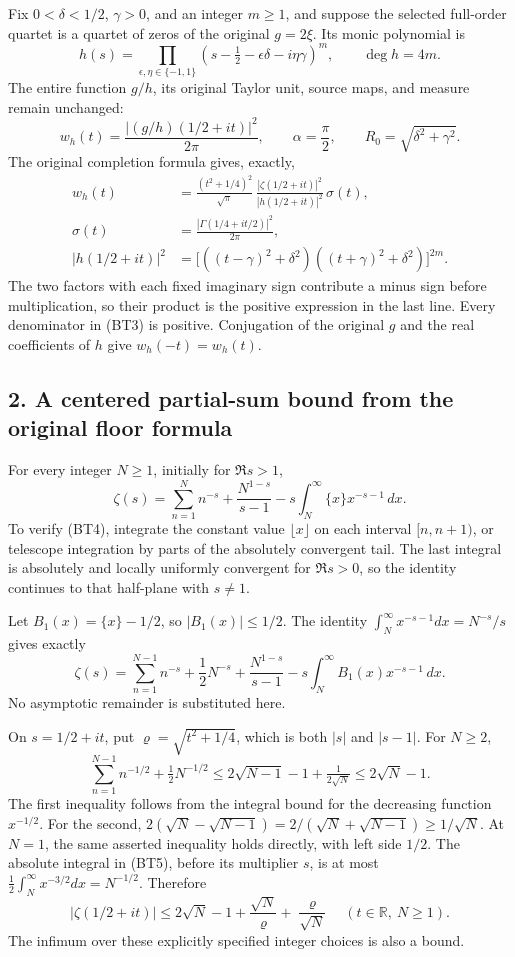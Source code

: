 \documentclass[11pt,a4paper]{article}
\begin{document}
Fix \(0<\delta<1/2\), \(\gamma>0\), and an integer \(m\ge1\), and suppose the selected full-order quartet is a quartet of zeros of the original \(g=2\xi\). Its monic polynomial is \[
h(s)=\prod_{\epsilon,\eta\in\{-1,1\}}
 (s-\tfrac12-\epsilon\delta-i\eta\gamma)^m,
\qquad \deg h=4m.
\tag{BT1}
\] The entire function \(g/h\), its original Taylor unit, source maps, and measure remain unchanged: \[
w_h(t)=\frac{|(g/h)(1/2+it)|^2}{2\pi},\qquad
\alpha=\frac\pi2,\qquad R_0=\sqrt{\delta^2+\gamma^2}.
\tag{BT2}
\] The original completion formula gives, exactly, \[
\begin{split}
w_h(t)
&=\frac{(t^2+1/4)^2}{\sqrt\pi}\,
 \frac{|\zeta(1/2+it)|^2}{|h(1/2+it)|^2}\,\sigma(t),\\
\sigma(t)
&=\frac{|\Gamma(1/4+it/2)|^2}{2\pi},\\
|h(1/2+it)|^2
&=\bigl[((t-\gamma)^2+\delta^2)
              ((t+\gamma)^2+\delta^2)\bigr]^{2m}.
\end{split}
\tag{BT3}
\] The two factors with each fixed imaginary sign contribute a minus sign before multiplication, so their product is the positive expression in the last line. Every denominator in (BT3) is positive. Conjugation of the original \(g\) and the real coefficients of \(h\) give \(w_h(-t)=w_h(t)\).

\subsection{2. A centered partial-sum bound from the original floor formula}\label{bt:a-centered-partial-sum-bound-from-the-original-floor-formula}

For every integer \(N\ge1\), initially for \(\Re s>1\), \[
\zeta(s)=\sum_{n=1}^{N}n^{-s}
 +\frac{N^{1-s}}{s-1}
 -s\int_N^\infty \{x\}x^{-s-1}\,dx.
\tag{BT4}
\] To verify (BT4), integrate the constant value \(\lfloor x\rfloor\) on each interval \([n,n+1)\), or telescope integration by parts of the absolutely convergent tail. The last integral is absolutely and locally uniformly convergent for \(\Re s>0\), so the identity continues to that half-plane with \(s\ne1\).

Let \(B_1(x)=\{x\}-1/2\), so \(|B_1(x)|\le1/2\). The identity \(\int_N^\infty x^{-s-1}dx=N^{-s}/s\) gives exactly \[
\zeta(s)=\sum_{n=1}^{N-1}n^{-s}+\frac12N^{-s}
 +\frac{N^{1-s}}{s-1}
 -s\int_N^\infty B_1(x)x^{-s-1}\,dx.
\tag{BT5}
\] No asymptotic remainder is substituted here.

On \(s=1/2+it\), put \(\varrho=\sqrt{t^2+1/4}\), which is both \(|s|\) and \(|s-1|\). For \(N\ge2\), \[
\sum_{n=1}^{N-1}n^{-1/2}+\tfrac12N^{-1/2}
\le 2\sqrt{N-1}-1+\tfrac1{2\sqrt N}
\le 2\sqrt N-1.
\] The first inequality follows from the integral bound for the decreasing function \(x^{-1/2}\). For the second, \(2(\sqrt N-\sqrt{N-1})=2/(\sqrt N+\sqrt{N-1})\ge1/\sqrt N\). At \(N=1\), the same asserted inequality holds directly, with left side \(1/2\). The absolute integral in (BT5), before its multiplier \(s\), is at most \(\tfrac12\int_N^\infty x^{-3/2}dx=N^{-1/2}\). Therefore \[
|\zeta(1/2+it)|
\le 2\sqrt N-1+\frac{\sqrt N}{\varrho}
                       +\frac{\varrho}{\sqrt N}
\quad(t\in\mathbb R,\ N\ge1).
\tag{BT6}
\] The infimum over these explicitly specified integer choices is also a bound.
\end{document}
